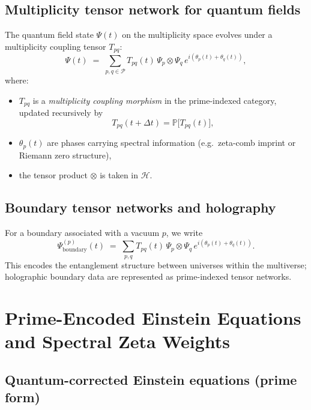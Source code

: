 \documentclass[11pt]{article}
\begin{document}
\subsection{Multiplicity tensor network for quantum fields}

The quantum field state \(\Psi(t)\) on the multiplicity space evolves under a multiplicity coupling tensor \(T_{pq}\):
\begin{equation}
  \Psi(t)
  \;=\;
  \sum_{p,q \in \mathcal{P}}
  T_{pq}(t)\, \Psi_p \otimes \Psi_q\,
  e^{i(\theta_p(t) + \theta_q(t))},
\end{equation}
where:
\begin{itemize}
  \item \(T_{pq}\) is a \emph{multiplicity coupling morphism} in the prime-indexed category, updated recursively by
  \begin{equation}
    T_{pq}(t+\Delta t) = \mathbb{P}\bigl[ T_{pq}(t) \bigr],
  \end{equation}
  \item \(\theta_p(t)\) are phases carrying spectral information (e.g.\ zeta-comb imprint or Riemann zero structure),
  \item the tensor product \(\otimes\) is taken in \(\mathcal{H}\).
\end{itemize}

\subsection{Boundary tensor networks and holography}

For a boundary associated with a vacuum \(p\), we write
\begin{equation}
  \Psi_{\text{boundary}}^{(p)}(t)
  \;=\;
  \sum_{p,q} T_{pq}(t)\, \Psi_p \otimes \Psi_q\,
  e^{i(\theta_p(t) + \theta_q(t))}.
\end{equation}
This encodes the entanglement structure between universes within the multiverse; holographic boundary data are represented as prime-indexed tensor networks.

\section{Prime-Encoded Einstein Equations and Spectral Zeta Weights}

\subsection{Quantum-corrected Einstein equations (prime form)}
\end{document}
